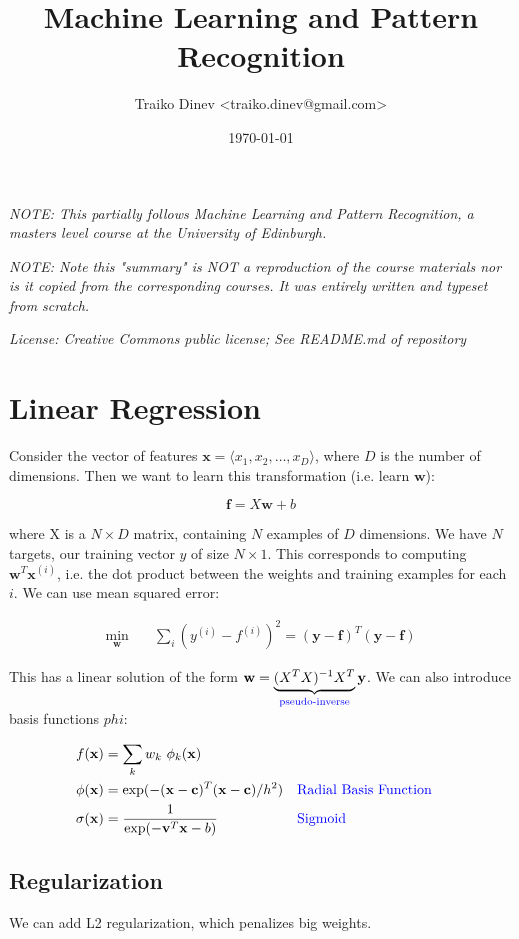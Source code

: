 \documentclass{article}
\title{Machine Learning and Pattern Recognition}
\date{\today}
\author{Traiko Dinev \textless traiko.dinev@gmail.com\textgreater}
\newcommand{\bm}[1]{\mathbf{#1}}
\newcommand{\blue}[1]{\textcolor{blue}{#1}}
\begin{document}
\maketitle
\textit{NOTE: This partially follows Machine Learning and Pattern Recognition, a masters level course at the University of Edinburgh.}

\textit{NOTE: Note this "summary" is NOT a reproduction of the course materials nor is it copied from the corresponding courses. It was entirely written and typeset from scratch.}

\textit{License: Creative Commons public license; See README.md of repository}

\section{Linear Regression}
Consider the vector of features $\bm{x} = \langle x_1, x_2, \dots, x_D \rangle$, where $D$ is the number of dimensions. Then we want to learn this transformation (i.e. learn $\bm{w}$):

\begin{equation}
    \bm{f} = X \bm{w} + b
\end{equation}

where X is a $N\times D$ matrix, containing $N$ examples of $D$ dimensions. We have $N$ targets, our training vector $y$ of size $N\times1$. This corresponds to computing $\bm{w}^T \bm{x}^{(i)}$, i.e. the dot product between the weights and training examples for each $i$. We can use mean squared error:

\begin{align*}
    \min_{\bm{w}} \quad& \sum_i (y^{(i)} - f^{(i)})^2
        = (\bm{y} - \bm{f})^T (\bm{y} - \bm{f})
\end{align*}

This has a linear solution of the form $\bm{w} = \underbrace{(X^TX)^{-1}X^T}_\text{\blue{pseudo-inverse}} \bm{y}$. We can also introduce basis functions $phi$:
\vskip 0.1in

\begin{align*}
    f(\bm{x}) &= \sum_k w_k\ \phi_k(\bm{x}) \\
    \phi(\bm{x}) &= \exp(-(\bm{x} - \bm{c})^T (\bm{x} - \bm{c}) / h^2)
        && \text{\blue{Radial Basis Function}} \\
    \sigma(\bm{x}) &= \frac{1}{\exp(-\bm{v}^T \bm{x} - b)}
        && \text{\blue{Sigmoid}}
\end{align*}

\subsection{Regularization}
We can add L2 regularization, which penalizes big weights.
\end{document}

